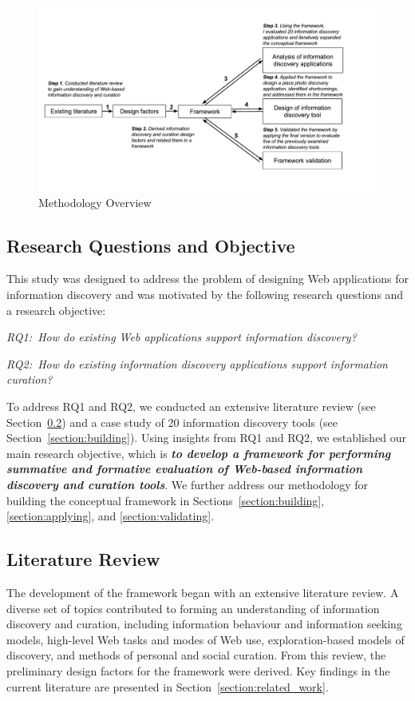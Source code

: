 \documentclass{sigchi}
\begin{document}
\begin{figure}
	\noindent
	\centering
    \includegraphics[width=2\columnwidth]{figures/methodology.pdf}
	\caption{Methodology Overview}
	\label{fig:methodology} 
\end{figure}

{\subsection{Research Questions and Objective}
This study was designed to address the problem of designing Web applications for information discovery and was motivated by the following research questions and a research objective:

\emph{RQ1:~How do existing Web applications support information discovery?}

\emph{RQ2:~How do existing information discovery applications support information curation?}

To address RQ1 and RQ2, we conducted an extensive literature review (see Section~\ref{section:lit_review}) and a case study of 20 information discovery tools (see Section~\ref{section:building}). Using insights from RQ1 and RQ2, we established our main research objective, which is \emph{\textbf{to develop a framework for performing summative and formative evaluation of Web-based information discovery and curation tools}}. We further address our methodology for building the conceptual framework in Sections~\ref{section:building}, \ref{section:applying}, and \ref{section:validating}.

}%

{\subsection{Literature Review}
\label{section:lit_review}
The development of the framework began with an extensive literature review. A diverse set of topics contributed to forming an understanding of information discovery and curation, including information behaviour and information seeking models, high-level Web tasks and modes of Web use, exploration-based models of discovery, and methods of personal and social curation. From this review, the preliminary design factors for the framework were derived. Key findings in the current literature are presented in Section~\ref{section:related_work}.
}%
\end{document}
